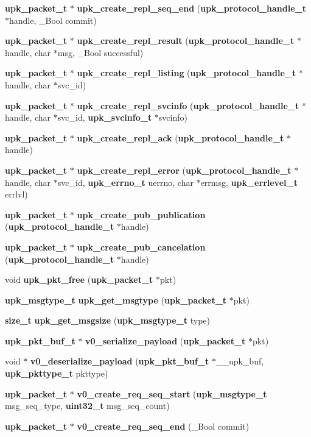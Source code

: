 \begin{DoxyCompactItemize}
{\bf upk\_\-packet\_\-t} $\ast$ {\bf upk\_\-create\_\-repl\_\-seq\_\-end} ({\bf upk\_\-protocol\_\-handle\_\-t} $\ast$handle, \_\-Bool commit)
\item 
{\bf upk\_\-packet\_\-t} $\ast$ {\bf upk\_\-create\_\-repl\_\-result} ({\bf upk\_\-protocol\_\-handle\_\-t} $\ast$handle, char $\ast$msg, \_\-Bool successful)
\item 
{\bf upk\_\-packet\_\-t} $\ast$ {\bf upk\_\-create\_\-repl\_\-listing} ({\bf upk\_\-protocol\_\-handle\_\-t} $\ast$handle, char $\ast$svc\_\-id)
\item 
{\bf upk\_\-packet\_\-t} $\ast$ {\bf upk\_\-create\_\-repl\_\-svcinfo} ({\bf upk\_\-protocol\_\-handle\_\-t} $\ast$handle, char $\ast$svc\_\-id, {\bf upk\_\-svcinfo\_\-t} $\ast$svcinfo)
\item 
{\bf upk\_\-packet\_\-t} $\ast$ {\bf upk\_\-create\_\-repl\_\-ack} ({\bf upk\_\-protocol\_\-handle\_\-t} $\ast$handle)
\item 
{\bf upk\_\-packet\_\-t} $\ast$ {\bf upk\_\-create\_\-repl\_\-error} ({\bf upk\_\-protocol\_\-handle\_\-t} $\ast$handle, char $\ast$svc\_\-id, {\bf upk\_\-errno\_\-t} uerrno, char $\ast$errmsg, {\bf upk\_\-errlevel\_\-t} errlvl)
\item 
{\bf upk\_\-packet\_\-t} $\ast$ {\bf upk\_\-create\_\-pub\_\-publication} ({\bf upk\_\-protocol\_\-handle\_\-t} $\ast$handle)
\item 
{\bf upk\_\-packet\_\-t} $\ast$ {\bf upk\_\-create\_\-pub\_\-cancelation} ({\bf upk\_\-protocol\_\-handle\_\-t} $\ast$handle)
\item 
void {\bf upk\_\-pkt\_\-free} ({\bf upk\_\-packet\_\-t} $\ast$pkt)
\item 
{\bf upk\_\-msgtype\_\-t} {\bf upk\_\-get\_\-msgtype} ({\bf upk\_\-packet\_\-t} $\ast$pkt)
\item 
{\bf size\_\-t} {\bf upk\_\-get\_\-msgsize} ({\bf upk\_\-msgtype\_\-t} type)
\item 
{\bf upk\_\-pkt\_\-buf\_\-t} $\ast$ {\bf v0\_\-serialize\_\-payload} ({\bf upk\_\-packet\_\-t} $\ast$pkt)
\item 
void $\ast$ {\bf v0\_\-deserialize\_\-payload} ({\bf upk\_\-pkt\_\-buf\_\-t} $\ast$\_\-\_\-upk\_\-buf, {\bf upk\_\-pkttype\_\-t} pkttype)
\item 
{\bf upk\_\-packet\_\-t} $\ast$ {\bf v0\_\-create\_\-req\_\-seq\_\-start} ({\bf upk\_\-msgtype\_\-t} msg\_\-seq\_\-type, {\bf uint32\_\-t} msg\_\-seq\_\-count)
\item 
{\bf upk\_\-packet\_\-t} $\ast$ {\bf v0\_\-create\_\-req\_\-seq\_\-end} (\_\-Bool commit)

\end{DoxyCompactItemize}

